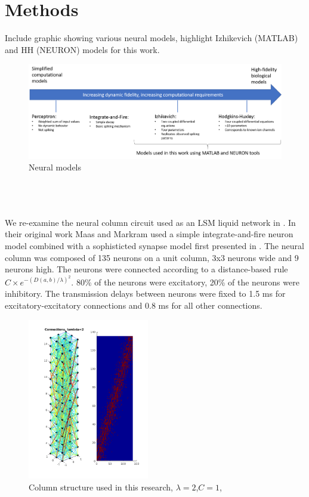 \documentclass[a4paper,11pt]{article}
\begin{document}
\section{Methods}
Include graphic showing various neural models, highlight Izhikevich \cite{izhikevich2003} (MATLAB) and HH (NEURON) models for this work.
\begin{figure}
 \caption{Neural models}
 \centering
   \includegraphics[width=\textwidth]{fig/neural_models}
\end{figure}\\
\\ \\
We re-examine the neural column circuit used as an LSM liquid network in \cite{maas2002}.
In their original work Maas and Markram used a simple integrate-and-fire neuron model combined with a sophisticted synapse model first presented in \cite{markram1998}.
The neural column was composed of 135 neurons on a unit column, 3x3 neurons wide and 9 neurons high.
The neurons were connected according to a distance-based rule $C \times e^{-(D(a,b)/\lambda)^2} $.
80\% of the neurons were excitatory, 20\% of the neurons were inhibitory. 
The transmission delays between neurons were fixed to 1.5 ms for excitatory-excitatory connections and 0.8 ms for all other connections.
\begin{figure}
 \caption{Column structure used in this research, $\lambda=2$,$C=1$,}
 \centering
   \includegraphics[width=200px]{fig/lambda2}
\end{figure}
\end{document}
